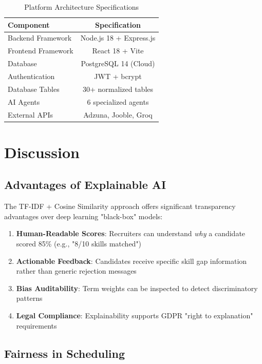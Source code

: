 \documentclass[conference]{IEEEtran}
\begin{document}
\begin{table}[htbp]
\caption{Platform Architecture Specifications}
\label{tab:system_stats}
\begin{center}
\begin{tabular}{|l|c|}
\hline
\textbf{Component} & \textbf{Specification} \\
\hline
Backend Framework & Node.js 18 + Express.js \\
Frontend Framework & React 18 + Vite \\
Database & PostgreSQL 14 (Cloud) \\
Authentication & JWT + bcrypt \\
Database Tables & 30+ normalized tables \\
AI Agents & 6 specialized agents \\
External APIs & Adzuna, Jooble, Groq \\
\hline
\end{tabular}
\end{center}
\end{table}

\section{Discussion}

\subsection{Advantages of Explainable AI}

The TF-IDF + Cosine Similarity approach offers significant transparency advantages over deep learning "black-box" models:

\begin{enumerate}
    \item \textbf{Human-Readable Scores}: Recruiters can understand \textit{why} a candidate scored 85\% (e.g., "8/10 skills matched")
    \item \textbf{Actionable Feedback}: Candidates receive specific skill gap information rather than generic rejection messages
    \item \textbf{Bias Auditability}: Term weights can be inspected to detect discriminatory patterns
    \item \textbf{Legal Compliance}: Explainability supports GDPR "right to explanation" requirements
\end{enumerate}

\subsection{Fairness in Scheduling}
\end{document}
